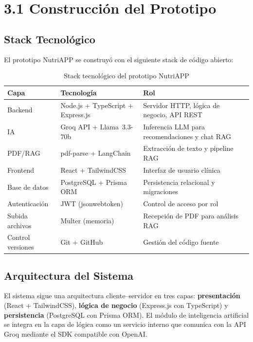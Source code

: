 \documentclass[12pt,a4paper]{article}
\begin{document}
\clearpage
\section{3.1 Construcción del Prototipo}

\subsection{Stack Tecnológico}

El prototipo NutriAPP se construyó con el siguiente stack de código abierto:

\begin{table}[H]
\centering
\caption{Stack tecnológico del prototipo NutriAPP}
\label{tab:stack}
\begin{tabularx}{\linewidth}{|l|l|X|}
\hline
\textbf{Capa} & \textbf{Tecnología} & \textbf{Rol} \\
\hline
Backend        & Node.js + TypeScript + Express.js & Servidor HTTP, lógica de negocio, API REST \\
\hline
IA             & Groq API + Llama~3.3-70b & Inferencia LLM para recomendaciones y chat RAG \\
\hline
PDF/RAG        & pdf-parse + LangChain   & Extracción de texto y pipeline RAG \\
\hline
Frontend       & React + TailwindCSS     & Interfaz de usuario clínica \\
\hline
Base de datos  & PostgreSQL + Prisma ORM & Persistencia relacional y migraciones \\
\hline
Autenticación  & JWT (jsonwebtoken)      & Control de acceso por rol \\
\hline
Subida archivos& Multer (memoria)        & Recepción de PDF para análisis RAG \\
\hline
Control versiones & Git + GitHub         & Gestión del código fuente \\
\hline
\end{tabularx}
\end{table}

\subsection{Arquitectura del Sistema}

El sistema sigue una arquitectura cliente–servidor en tres capas: \textbf{presentación}
(React + TailwindCSS), \textbf{lógica de negocio} (Express.js con TypeScript) y
\textbf{persistencia} (PostgreSQL con Prisma ORM). El módulo de inteligencia artificial
se integra en la capa de lógica como un servicio interno que comunica con la API Groq
mediante el SDK compatible con OpenAI.
\end{document}
